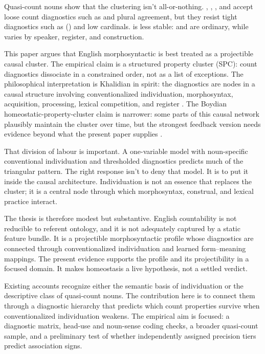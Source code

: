 \documentclass[12pt,a4paper]{article}
\begin{document}
Quasi-count nouns show that the clustering isn't all-or-nothing. , , , and  accept loose count diagnostics such as  and plural agreement, but they resist tight diagnostics such as () and low cardinals.  is less stable:  and  are ordinary, while  varies by speaker, register, and construction.

This paper argues that English morphosyntactic  is best treated as a projectible causal cluster. The empirical claim is a structured property cluster (SPC): count diagnostics dissociate in a constrained order, not as a list of exceptions. The philosophical interpretation is Khalidian in spirit: the diagnostics are nodes in a causal structure involving conventionalized individuation, morphosyntax, acquisition, processing, lexical competition, and register \citep{khalidi2013}. The Boydian homeostatic-property-cluster claim is narrower: some parts of this causal network plausibly maintain the cluster over time, but the strongest feedback version needs evidence beyond what the present paper supplies \citep{boyd1991,boyd1999}.

That division of labour is important. A one-variable model with noun-specific conventional individuation and thresholded diagnostics predicts much of the triangular pattern. The right response isn't to deny that model. It is to put it inside the causal architecture. Individuation is not an essence that replaces the cluster; it is a central node through which morphosyntax, construal, and lexical practice interact.

The thesis is therefore modest but substantive. English countability is not reducible to referent ontology, and it is not adequately captured by a static feature bundle. It is a projectible morphosyntactic profile whose diagnostics are connected through conventionalized individuation and learned form--meaning mappings. The present evidence supports the profile and its projectibility in a focused domain. It makes homeostasis a live hypothesis, not a settled verdict.

Existing accounts recognize either the semantic basis of individuation or the descriptive class of quasi-count nouns. The contribution here is to connect them through a diagnostic hierarchy that predicts which count properties survive when conventionalized individuation weakens. The empirical aim is focused: a diagnostic matrix, head-use and noun-sense coding checks, a broader quasi-count sample, and a preliminary test of whether independently assigned precision tiers predict association signs.
\end{document}
